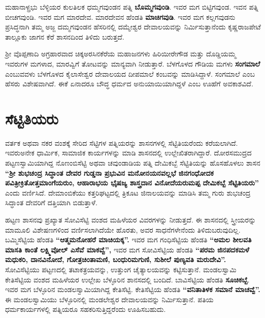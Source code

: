 ಮಹಾನಾಳ್ಪ್ರಭು ಬೆಳ್ಳಿಯರ ಕುಲತಿಲಕ ಧಮ್ಮಗವುಂಡನ ಪತ್ನಿ \textbf{ಬೊಮ್ಮಗವುಂಡಿ}. ಇವರ ಮಗ ಬಿಟ್ಟಿಗವುಂಡ. ಇವನ ಪತ್ನಿ ಬೀಚಗವುಂಡಿ. ಇವರ ಮಗ ಮಾರದೇವ. ಮಾರದೇವನ ಹೆಂಡತಿ \textbf{ಮಾಚಿಗವುಡಿ}. ಇವರ ಮಗ ಕಲ್ಲಗವುಡನು ಪ್ರಸಿದ್ಧನಾಗಿ ತಮ್ಮ ಅಜ್ಜ ದಮ್ಮಗವುಂಡನ ಹೆಸರಿನಲ್ಲಿ ದಮ್ಮೇಶ್ವರ ದೇವಾಲಯವನ್ನು ನಿರ್ಮಿಸುತ್ತಾನೆಂದು ಕೃಷ್ಣರಾಜಪೇಟೆ ತಾಲ್ಲೂಕು ಜಾಗನ ಕೆರೆ ಶಾಸನದಿಂದ ತಿಳಿದು ಬರುತ್ತದೆ.

ಶ‍್ರೀ ವೊಪ್ಪಣಾದಿ ಅಗ್ರಹಾರವಾದ ಚಿಕ್ಕಅರಸಿನಕೆರೆಯ ಮಹಾಜನಗಳು ಹಿರಿಯೀರೇಗೌಡ ಮತ್ತು ದೊಡ್ಡಿಯಮ್ಮ ಇವರುಗಳ ಮಗಳಾದ, ಮಾರವ್ವಿಗೆ ತೋಟವನ್ನು ಮಾನ್ಯವಾಗಿ ನೀಡುತ್ತಾರೆ. ಬೆಳಗೊಳದ ಗೌಡಿಯ ಮಗಳು \textbf{ಸಂಗಮಾಲೆ} ಎಂಬುವವಳು ಬೆಳಗೊಳದ ಕೈಲಾಸೇಶ್ವರ ದೇವಾಲಯದ ದೀಪಮಾಲೆ ಕಂಬವನ್ನು ಮಾಡಿಸಿದ್ದಾಳೆ. ಸಂಗಮಾಲೆ ಎಂಬ ಹೆಸರು ವಿಶೇಷವಾಗಿದೆ. ಈಕೆ ಏನಾದರೂ ಬೌದ್ಧ ಧರ್ಮದ ಅನುಯಾಯಿಯಾಗಿದ್ದಳೆ ಎಂಬ ಊಹೆಗೆ ಅವಕಾಶವಿದೆ.


\section*{ಸೆಟ್ಟಿತಿಯರು}

ವರ್ತಕ ಅಥವಾ ನಕರ ವಂಶಕ್ಕೆ ಸೇರಿದ ಸೆಟ್ಟಿಗಳ ಪತ್ನಿಯರನ್ನು ಶಾಸನಗಳಲ್ಲಿ ಸೆಟ್ಟಿತಿಯರೆಂದು ಕರೆಯಲಾಗಿದೆ. ಇವರು\break ಅನೇಕ ಧಾರ್ಮಿಕ, ಸಾಮಾಜಿಕ ಕಾರ್ಯಗಳನ್ನು ಮಾಡಿ ಶಾಸನದಲ್ಲಿ ಉಲ್ಲೇಖಿತರಾಗಿದ್ದಾರೆ. ದೋರಸಮುದ್ರದ ಪಟ್ಟಣಸ್ವಾಮಿ\-ಯಾಗಿದ್ದ ನೊಣಂಬಿಸೆಟ್ಟಿ ಅಥವಾ ಚವುಂಡಾಡಿಯ ಪತ್ನಿ ದೇಮಿಕಬ್ಬೆ ಸೆಟ್ಟಿತಿಯನ್ನು ಹೊಸಹೊಳಲು ಶಾಸನ \textbf{“ಶ‍್ರೀ ಶುಭಚಂದ್ರ ಸಿದ್ಧಾಂತ ದೇವರ ಗುಡ್ಡನಾ ಪ್ರಭುವಿನ ಮನೋನಯನವಲ್ಲಭೆ ಜಿನಗಂಧೋದಕ ಪವಿತ್ರೀಕ್ರಿತೋತ್ತಮಾಂಗೆಯರುಂ, ಆಹಾರಾಭಯ ಭೈಷಜ್ಯ ಶಾಸ್ತ್ರದಾನ ವಿನೋದೆಯರುಮಪ್ಪ ದೇಮಿಕಬ್ಬೆ ಸೆಟ್ಟಿತಿಯರು”} ಎಂದು ವರ್ಣಿಸಿದೆ. ದೇಮಾಂಬಿಕೆಯು ಕತ್ತರಿಘಟ್ಟದಲ್ಲಿ ತ್ರಿಕೂಟ ಜಿನಾಲಯವನ್ನು ಮಾಡಿಸಿ ತಮ್ಮ ಗುರು ಶುಭಚಂದ್ರ ಸಿದ್ಧಾಂತ ದೇವರಿಗೆ ದತ್ತಿಯಾಗಿ ಬಿಡುತ್ತಾಳೆ.

ಹಟ್ಟಣ ಶಾಸನವು ಪ್ರಖ್ಯಾತ ಸೋವಿಸೆಟ್ಟಿ ವಂಶದ ಮಹಿಳೆಯರ ವಿವರಗಳನ್ನು ನೀಡುತ್ತದೆ. ಈ ಶಾಸನ\-ದಲ್ಲಿ ಸ್ತ್ರೀಯರನ್ನು ಮಾಮೂಲಿ ವಿಶೇಷಣಗಳಿಂದ ವರ್ಣಿಸಲಾಗಿದೆಯೇ ಹೊರತು, ಅವರ ಸಾಧನೆಗಳೇನೆಂದು ತಿಳಿದುಬರುವುದಿಲ್ಲ. ಬಮ್ಮಿಸೆಟ್ಟಿಯ ಹೆಂಡತಿ \textbf{“ಆತ್ಮಮನೋಹರೆ ಮಾಚಿಯಕ್ಕ”.} ಇವರ ಮಗ ಗಂಧಿಸೆಟ್ಟಿಯ ಹೆಂಡತಿ \textbf{“ಅಮಲ ಶೀಲವತಿ ಮಾಸತಿ ಕಾಂತೆ ಲಕ್ಷ್ಮಿವೋಲ್​ ಎಸೆವೆ ಮಾಕವ್ವೆ”,} ಇವರ ಮಗ ಸೋವಿಸೆಟ್ಟಿಯ ಹೆಂಡತಿ \textbf{“ಪರಮ ಜಿನಪದಕಮಳೆ ಮಧುಕರಿ, ದಾನವಿನೋದೆ, ಗೋತ್ರಚಿಂತಾಮಣಿ, ಬಂಧುರಿಮಗುಣಿ, ಸುಶೀಲೆ ಪುಣ್ಯವತಿ ಮರುದೇವಿ”.} ಸೋವಿಸೆಟ್ಟಿಯು ಪಟ್ಟಣದಲ್ಲಿ ತಟಾಕತ್ರಯವನ್ನು, ಉತ್ತುಂಗ ಚೈತ್ಯಾಲಯವನ್ನು ಕಟ್ಟಿಸುತ್ತಾನೆ. ಮಂಡಲಸ್ವಾಮಿ ಕೇತಿಸೆಟ್ಟಿಯ ವಂಶದ ಮಹಿಳೆಯರ ಉಲ್ಲೇಖ ಬೆಳ್ಳೂರಿನ ಶಾನಸದಲ್ಲಿ ಬಂದಿದೆ. ಬಾವಿಸೆಟ್ಟಿಯ ಹೆಂಡತಿ \textbf{ಸೂಚಿಕಬ್ಬೆ}. ಇವರ ಮಗ ಬೆಳ್ಳೂರಿನ ಮಂಡಲಸ್ವಾಮಿಯಾಗಿದ್ದ ಕೇತಿಸೆಟ್ಟಿ. ಕೇತಿಸೆಟ್ಟಿಯ ಹೆಂಡತಿ \textbf{“ವನಿತಾತಿಳಕ ಸಮಾನೆ ಮಾಚವ್ವೆ”.} ಈ ಮಂಡಲಸ್ವಾಮಿಯು ಬೆಳ್ಳೂರಿನಲ್ಲಿ ಮಂಡಲೇಶ್ವರ ದೇವಾಲಯವನ್ನು ನಿರ್ಮಿಸುತ್ತಾನೆ. ಪತಿಯ ಧರ್ಮಕಾರ್ಯಗಳಲ್ಲಿ ಪತ್ನಿಯರೂ ಸಹಕರಿಸುತ್ತಿದ್ದರೆಂದು ಊಹಿಸಬಹುದು.


